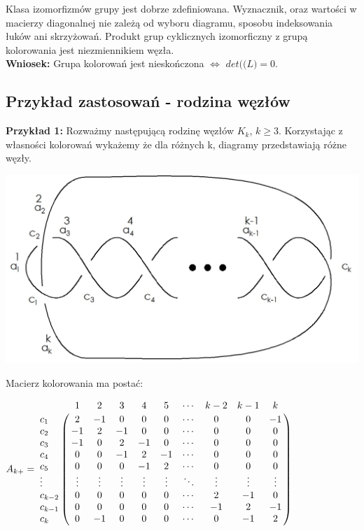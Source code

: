 Klasa izomorfizmów grupy jest dobrze zdefiniowana. Wyznacznik, oraz wartości w macierzy diagonalnej nie zależą od wyboru diagramu, sposobu indeksowania łuków ani skrzyżowań. Produkt grup cyklicznych izomorficzny z grupą kolorowania jest niezmiennikiem węzła. \\
\textbf{Wniosek:} Grupa kolorowań jest nieskończona $\Leftrightarrow$ $det(\big(L\big) = 0$.


\subsection{Przykład zastosowań - rodzina węzłów}
\textbf{Przykład 1:}
Rozważmy następującą rodzinę węzłów $K_{k}$, $k \geq 3 $. Korzystając z własności kolorowań wykażemy że dla różnych k, diagramy przedstawiają różne węzły. 
\begin{center}
\includegraphics[scale=0.3]{2/Obrazy/Wezelprzyklad} \\
\end{center}
Macierz kolorowania ma postać:
\begin{center}


$A_{k+}=\bordermatrix{
~       &  1 &  2 &  3 &  4 &  5 & \cdots & k-2  &  k-1 &  k \cr
c_{1}   &  2 & -1 &  0 &  0 &  0 & \cdots &  0   &  0   & -1 \cr
c_{2}   & -1 &  2 & -1 &  0 &  0 & \cdots &  0   &  0   &  0 \cr
c_{3}   & -1 &  0 &  2 & -1 &  0 & \cdots &  0   &  0   &  0 \cr
c_{4}   &  0 &  0 & -1 &  2 & -1 & \cdots &  0   &  0   &  0 \cr
c_{5}   &  0 &  0 &  0 & -1 &  2 & \cdots &  0   &  0   &  0 \cr
\vdots  &  \vdots &  \vdots &  \vdots &  \vdots &  \vdots & \ddots &  \vdots   & \vdots   &  \vdots \cr
c_{k-2} &  0 &  0 &  0 &  0 &  0 & \cdots &  2   & -1   &  0 \cr
c_{k-1} &  0 &  0 &  0 &  0 &  0 & \cdots &  -1  &  2   & -1 \cr
c_{k}   &  0 & -1 &  0 &  0 &  0 & \cdots &  0   & -1   &  2 \cr}
$


\end{center}

